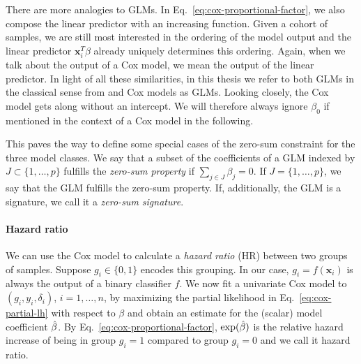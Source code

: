 There are more analogies to GLMs. In Eq.\ \eqref{eq:cox-proportional-factor}, we also compose the 
linear predictor with an increasing function. Given a cohort of samples, we are still most 
interested in the ordering of the model output and the linear predictor $\mathbf{x}_i^T \beta$ 
already uniquely determines this ordering. Again, when we talk about the output of a Cox model, we 
mean the output of the linear predictor. In light of all these similarities,
in this thesis we refer to both GLMs in the classical sense from \cite{glm72} and Cox models as 
GLMs. Looking closely, the Cox model gets along without an intercept. We will therefore always 
ignore $\beta_0$ if mentioned in the context of a Cox model in the following.

This paves the way to define some special cases of the zero-sum constraint for the three model 
classes. We say that a subset of the coefficients of a GLM indexed by $J \subset \{1, \ldots, p \}$ 
fulfills the \textit{zero-sum property} if $\sum_{j \in J} \beta_j = 0$. If $J = \{1, \ldots, p \}$, 
we say that the GLM fulfills the zero-sum property. If, additionally, the GLM is a signature, we 
call it a \textit{zero-sum signature}. 

\paragraph{Hazard ratio}

We can use the Cox model to calculate a \textit{hazard ratio} (HR) between two groups of samples. 
Suppose $g_i \in \{0, 1\}$ encodes this grouping. In our case, $g_i = f(\mathbf{x}_i)$ is always 
the output of a binary classifier $f$. We now fit a univariate Cox model to $(g_i, y_i, \delta_i)$, 
$i = 1, \ldots, n$, by maximizing 
the partial likelihood in Eq.\ \eqref{eq:cox-partial-lh} with respect to $\beta$ and obtain an estimate
for the (scalar) model coefficient $\hat{\beta}$. By Eq.\ \eqref{eq:cox-proportional-factor}, 
$\exp(\hat{\beta})$ is the relative hazard increase of being in group $g_i = 1$ compared to group 
$g_i = 0$ and we call it hazard ratio.


